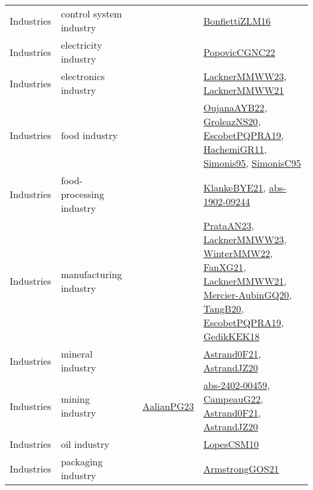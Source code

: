 {\begin{longtable}{lp{3cm}>{\raggedright}p{6cm}>{\raggedright}p{6cm}p{8cm}}
Industries & control system industry &  &  & \href{papers/BonfiettiZLM16.pdf}{BonfiettiZLM16}\cite{BonfiettiZLM16}\\
Industries & electricity industry &  &  & \href{papers/PopovicCGNC22.pdf}{PopovicCGNC22}\cite{PopovicCGNC22}\\
Industries & electronics industry &  &  & \href{articles/LacknerMMWW23.pdf}{LacknerMMWW23}\cite{LacknerMMWW23}, \href{papers/LacknerMMWW21.pdf}{LacknerMMWW21}\cite{LacknerMMWW21}\\
Industries & food industry &  &  & \href{papers/OujanaAYB22.pdf}{OujanaAYB22}\cite{OujanaAYB22}, \href{papers/GroleazNS20.pdf}{GroleazNS20}\cite{GroleazNS20}, \href{articles/EscobetPQPRA19.pdf}{EscobetPQPRA19}\cite{EscobetPQPRA19}, \href{articles/HachemiGR11.pdf}{HachemiGR11}\cite{HachemiGR11}, \href{papers/Simonis95.pdf}{Simonis95}\cite{Simonis95}, \href{papers/SimonisC95.pdf}{SimonisC95}\cite{SimonisC95}\\
Industries & food-processing industry &  &  & \href{papers/KlankeBYE21.pdf}{KlankeBYE21}\cite{KlankeBYE21}, \href{articles/abs-1902-09244.pdf}{abs-1902-09244}\cite{abs-1902-09244}\\
Industries & manufacturing industry &  &  & \href{articles/PrataAN23.pdf}{PrataAN23}\cite{PrataAN23}, \href{articles/LacknerMMWW23.pdf}{LacknerMMWW23}\cite{LacknerMMWW23}, \href{papers/WinterMMW22.pdf}{WinterMMW22}\cite{WinterMMW22}, \href{articles/FanXG21.pdf}{FanXG21}\cite{FanXG21}, \href{papers/LacknerMMWW21.pdf}{LacknerMMWW21}\cite{LacknerMMWW21}, \href{papers/Mercier-AubinGQ20.pdf}{Mercier-AubinGQ20}\cite{Mercier-AubinGQ20}, \href{papers/TangB20.pdf}{TangB20}\cite{TangB20}, \href{articles/EscobetPQPRA19.pdf}{EscobetPQPRA19}\cite{EscobetPQPRA19}, \href{articles/GedikKEK18.pdf}{GedikKEK18}\cite{GedikKEK18}\\
Industries & mineral industry &  &  & \href{papers/Astrand0F21.pdf}{Astrand0F21}\cite{Astrand0F21}, \href{articles/AstrandJZ20.pdf}{AstrandJZ20}\cite{AstrandJZ20}\\
Industries & mining industry &  & \href{papers/AalianPG23.pdf}{AalianPG23}\cite{AalianPG23} & \href{articles/abs-2402-00459.pdf}{abs-2402-00459}\cite{abs-2402-00459}, \href{articles/CampeauG22.pdf}{CampeauG22}\cite{CampeauG22}, \href{papers/Astrand0F21.pdf}{Astrand0F21}\cite{Astrand0F21}, \href{articles/AstrandJZ20.pdf}{AstrandJZ20}\cite{AstrandJZ20}\\
Industries & oil industry &  &  & \href{articles/LopesCSM10.pdf}{LopesCSM10}\cite{LopesCSM10}\\
Industries & packaging industry &  &  & \href{papers/ArmstrongGOS21.pdf}{ArmstrongGOS21}\cite{ArmstrongGOS21}\\

\end{longtable}}
